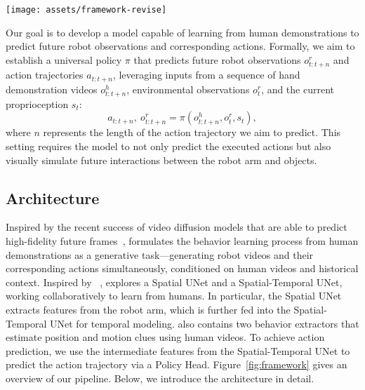 \section{\system}
\label{sec:method}
\begin{figure*}[t]
\centering
\texttt{[image: assets/framework-revise]}
\vspace{-2.0em}
\caption{\textbf{Architecture overview of \system.} Our approach consists of two training stages. In the first stage, only Behavior Extractors and Spatial Layer in both Spatial UNet and Spatial-Temporal UNet are trainable. In the second stage, we only train Temporal Layer and Policy Head. The Pretrained Encoder and Decoder are frozen all the time. In inference, we have two different modes: the KNN-Based mode can complete seen tasks without hand video, while the Manual Guided mode can complete both seen and unseen tasks. Proprio refers to the proprioception of the robot.}
\label{fig:framework}
\vspace{-1.2em}
\end{figure*}
Our goal is to develop a model capable of learning from human demonstrations to predict future robot observations and corresponding actions. Formally, we aim to establish a universal policy $\pi$ that predicts future robot observations $o^r_{t:t+n}$ and action trajectories $a_{t:t+n}$, leveraging inputs from a sequence of hand demonstration videos $o^h_{t:t+n}$, environmental observations $o^r_{t}$, and the current proprioception  $s_t$:
\begin{equation}
a_{t:t+n},\ o^r_{t:t+n} = \pi(o^h_{t:t+n}, o^r_{t}, s_t),
\end{equation} where $n$ represents the length of the action trajectory we aim to predict. 
This setting requires the model to not only predict the executed actions but also visually simulate future interactions between the robot arm and objects.

\subsection{Architecture}
Inspired by the recent success of video diffusion models that are able to predict high-fidelity future frames~\cite{guo2023animatediff}, \system formulates the behavior learning process from human demonstrations as a generative task---generating robot videos and their corresponding actions simultaneously, conditioned on human videos and historical context. Inspired by ~\cite{hu2024animate}, \system explores a Spatial UNet and a Spatial-Temporal UNet, working collaboratively to learn from humans. In particular, the Spatial UNet extracts features from the robot arm, which is further fed into the Spatial-Temporal UNet for temporal modeling. \system also contains two behavior extractors that estimate position and motion clues using human videos. To achieve action prediction, we use the intermediate features from the Spatial-Temporal UNet to predict the action trajectory via a Policy Head. Figure~\ref{fig:framework} gives an overview of our pipeline. Below, we introduce the architecture in detail.


